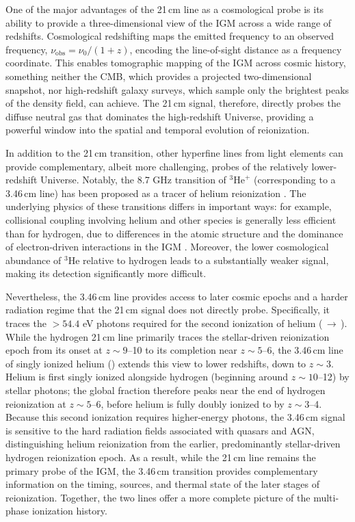 \documentclass[apj,twocolumn, appendixfloats, twocolappendix, numberedappendix, tighten]{openjournal}
\begin{document}
One of the major advantages of the 21\,cm line as a cosmological probe is its ability to provide a three-dimensional view of the IGM across a wide range of redshifts. Cosmological redshifting maps the emitted frequency to an observed frequency, $\nu_\mathrm{obs} = \nu_0/(1+z)$, encoding the line-of-sight distance as a frequency coordinate. This enables tomographic mapping of the IGM across cosmic history, something neither the CMB, which provides a projected two-dimensional snapshot, nor high-redshift galaxy surveys, which sample only the brightest peaks of the density field, can achieve. The 21\,cm signal, therefore, directly probes the diffuse neutral gas that dominates the high-redshift Universe, providing a powerful window into the spatial and temporal evolution of reionization.


In addition to the 21\,cm transition, other hyperfine lines from light elements can provide complementary, albeit more challenging, probes of the relatively lower-redshift Universe. Notably, the 8.7 GHz transition of $^3\mathrm{He}^+$ (corresponding to a 3.46\,cm line) has been proposed as a tracer of helium reionization \citep[][]{Furlanetto2008a, Furlanetto2008b, Bagla2009, McQuinn2009}. The underlying physics of these transitions differs in important ways: for example, collisional coupling involving helium and other species is generally less efficient than for hydrogen, due to differences in the atomic structure and the dominance of electron-driven interactions in the IGM \citep[][]{Furlanetto2006, Hirata2007, McQuinn2009, Takeuchi2014}. Moreover, the lower cosmological abundance of $^3\mathrm{He}$ relative to hydrogen leads to a substantially weaker signal, making its detection significantly more difficult.


Nevertheless, the 3.46\,cm line provides access to later cosmic epochs and a harder radiation regime that the 21\,cm signal does not directly probe. Specifically, it traces the $>54.4$ eV photons required for the second ionization of helium (\,$\rightarrow$\,). While the hydrogen 21\,cm line primarily traces the stellar-driven  reionization epoch from its onset at $z \sim 9$--10 to its completion near $z \sim 5$--6, the 3.46\,cm line of singly ionized helium () extends this view to lower redshifts, down to $z \sim 3$. Helium is first singly ionized alongside hydrogen (beginning around $z \sim 10$--12) by stellar photons; the global  fraction therefore peaks near the end of hydrogen reionization at $z \sim 5$--6, before helium is fully doubly ionized to  by $z \sim 3$--4. Because this second ionization requires higher-energy photons, the 3.46\,cm signal is sensitive to the hard radiation fields associated with quasars and AGN, distinguishing helium reionization from the earlier, predominantly stellar-driven hydrogen reionization epoch. As a result, while the 21\,cm line remains the primary probe of the IGM, the 3.46\,cm transition provides complementary information on the timing, sources, and thermal state of the later stages of reionization. Together, the two lines offer a more complete picture of the multi-phase ionization history.
\end{document}
